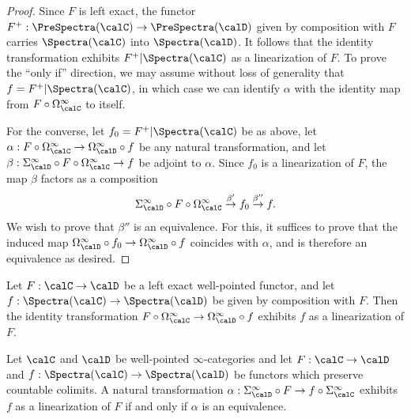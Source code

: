 \begin{proof}
Since $F$ is left exact, the functor $F^{+}: \PreSpectra(\calC) \rightarrow \PreSpectra(\calD)$
given by composition with $F$ carries $\Spectra(\calC)$ into $\Spectra(\calD)$. It follows that
the identity transformation exhibits $F^{+} | \Spectra(\calC)$ as a linearization of $F$.
To prove the ``only if'' direction, we may assume without loss of generality that
$f = F^{+} | \Spectra(\calC)$, in which case we can identify $\alpha$ with the identity
map from $F \circ \Omega^{\infty}_{\calC}$ to itself.

For the converse, let $f_0 = F^{+} | \Spectra(\calC)$ be as above, let
$\alpha: F \circ \Omega^{\infty}_{\calC} \rightarrow \Omega^{\infty}_{\calD} \circ f$
be any natural transformation, and let $\beta: \Sigma^{\infty}_{\calD} \circ F \circ \Omega^{\infty}_{\calC} \rightarrow f$ be adjoint to $\alpha$. Since $f_0$ is a linearization of $F$, the map
$\beta$ factors as a composition
$$  \Sigma^{\infty}_{\calD} \circ F \circ \Omega^{\infty}_{\calC} \stackrel{\beta'}{\rightarrow}
f_0 \stackrel{\beta''}{\rightarrow} f.$$
We wish to prove that $\beta''$ is an equivalence. For this, it suffices to prove that the
induced map $\Omega^{\infty}_{\calD} \circ f_0 \rightarrow \Omega^{\infty}_{\calD} \circ f$
coincides with $\alpha$, and is therefore an equivalence as desired.
\end{proof}

\begin{corollary}\label{abler}
Let $F: \calC \rightarrow \calD$ be a left exact well-pointed functor, and let
$f: \Spectra(\calC) \rightarrow \Spectra(\calD)$ be given by composition with $F$.
Then the identity transformation $F \circ \Omega^{\infty}_{\calC} \rightarrow
\Omega^{\infty}_{\calD} \circ f$ exhibits $f$ as a linearization of $F$.
\end{corollary}

\begin{proposition}\label{kunst2}
Let $\calC$ and $\calD$ be well-pointed $\infty$-categories 
and let $F: \calC \rightarrow \calD$ and $f: \Spectra(\calC) \rightarrow \Spectra(\calD)$ be functors which preserve countable colimits. A natural transformation $\alpha: \Sigma^{\infty}_{\calD} \circ F \rightarrow f \circ \Sigma^{\infty}_{\calC}$ exhibits
$f$ as a linearization of $F$ if and only if $\alpha$ is an equivalence.
\end{proposition}


